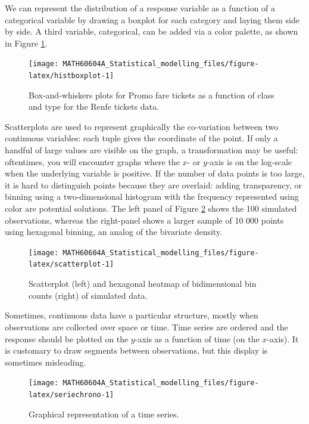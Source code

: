 \documentclass[
  11pt,
  letterpaper,
]{book}
\theoremstyle{definition}
\theoremstyle{definition}
\theoremstyle{definition}
\theoremstyle{remark}
\begin{document}
We can represent the distribution of a response variable as a function of a categorical variable by drawing a boxplot for each category and laying them side by side. A third variable, categorical, can be added via a color palette, as shown in Figure \ref{fig:histboxplot}.

\begin{figure}

{\centering \texttt{[image: MATH60604A\_Statistical\_modelling\_files/figure-latex/histboxplot-1]} 

}

\caption{Box-and-whiskers plots for Promo fare tickets as a function of class and type for the Renfe tickets data.}\label{fig:histboxplot}
\end{figure}

Scatterplots are used to represent graphically the co-variation between two continuous variables: each tuple gives the coordinate of the point. If only a handful of large values are visible on the graph, a transformation may be useful: oftentimes, you will encounter graphs where the \(x\)- or \(y\)-axis is on the log-scale when the underlying variable is positive. If the number of data points is too large, it is hard to distinguish points because they are overlaid: adding transparency, or binning using a two-dimensional histogram with the frequency represented using color are potential solutions. The left panel of Figure \ref{fig:scatterplot} shows the 100 simulated observations, whereas the right-panel shows a larger sample of 10 000 points using hexagonal binning, an analog of the bivariate density.

\begin{figure}

{\centering \texttt{[image: MATH60604A\_Statistical\_modelling\_files/figure-latex/scatterplot-1]} 

}

\caption{Scatterplot (left) and hexagonal heatmap of bidimensional bin counts (right) of simulated data.}\label{fig:scatterplot}
\end{figure}

Sometimes, continuous data have a particular structure, mostly when observations are collected over space or time. Time series are ordered and the response should be plotted on the \(y\)-axis as a function of time (on the \(x\)-axis). It is customary to draw segments between observations, but this display is sometimes misleading.

\begin{figure}

{\centering \texttt{[image: MATH60604A\_Statistical\_modelling\_files/figure-latex/seriechrono-1]} 

}

\caption{Graphical representation of a time series.}\label{fig:seriechrono}
\end{figure}
\end{document}
